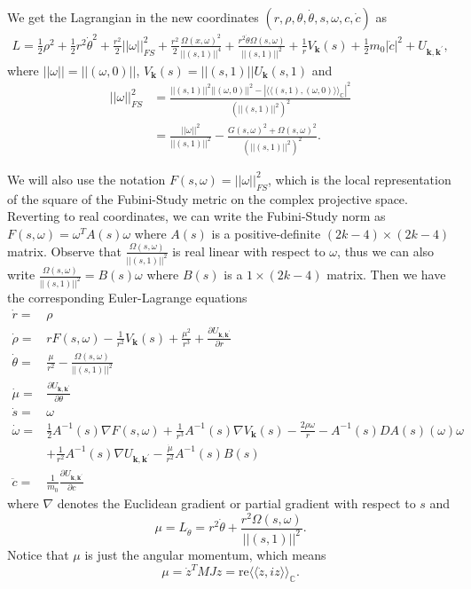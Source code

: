 \documentclass[11pt]{amsart}
\theoremstyle{definition}
\theoremstyle{remark}
\numberwithin{equation}{section}
\newcommand{\tht}{\theta}
\newcommand{\om}{\omega}
\begin{document}
We get the Lagrangian in the new coordinates $(r, \rho, \tht, \dot{\tht}, s, \om, c, \dot{c})$ as
\begin{align*}
    L=\frac{1}{2}\rho^2+\frac{1}{2}r^2\dot{\theta}^2+\frac{r^2}{2}||\omega||_{FS}^2+\frac{r^2}{2}\frac{\Omega(x,\omega)^2}{||(s,1)||^4}+\frac{r^2\dot{\theta}\Omega(s,\omega)}{||(s,1)||^2}+\frac{1}{r}V_\mathbf{k}(s)+\frac{1}{2}m_0|\dot{c}|^2+U_{\mathbf{k},\mathbf{k}^\prime},
\end{align*}
where $||\omega|| = ||(\omega,0)||$, $V_{\mathbf{k}}(s)=||(s,1)||U_{\mathbf{k}}(s,1)$ and 
\begin{align*}
    ||\omega||_{FS}^2&=\frac{||(s,1)||^2||(\omega,0)||^2-|\langle\langle(s,1),(\omega,0)\rangle\rangle_{\mathbb{C}}|^2}{(||(s,1)||^2)^2}\\
    &=\frac{||\omega||^2}{||(s,1)||^2}-\frac{G(s,\omega)^2+\Omega(s,\omega)^2}{(||(s,1)||^2)^2}.
\end{align*}

We will also use the notation $F(s,\omega)=||\omega||_{FS}^2$, which is the local representation of the square of the Fubini-Study metric on the complex projective space.\\
\indent Reverting to real coordinates, we can write the Fubini-Study norm as $F(s,\omega)=\omega^TA(s)\omega$ where $A(s)$ is a positive-definite $(2k-4)\times(2k-4)$ matrix. Observe that $\frac{\Omega(s,\omega)}{||(s,1)||^2}$ is real linear with respect to $\omega$, thus we can also write $\frac{\Omega(s,\omega)}{||(s,1)||^2}=B(s)\omega$ where $B(s)$ is a $1\times(2k-4)$ matrix. Then we have the corresponding Euler-Lagrange equations
\begin{equation}
\label{eq;EL-eq}
\begin{aligned}
    \dot{r}=&\rho\\
    \dot{\rho}=&rF(s,\omega)-\frac{1}{r^2}V_\mathbf{k}(s)+\frac{\mu^2}{r^3}+\frac{\partial U_{\mathbf{k},\mathbf{k}^\prime}}{\partial r}\\
    \dot{\theta}=&\frac{\mu}{r^2}-\frac{\Omega(s,\omega)}{||(s,1)||^2}\\
    \dot{\mu}=&\frac{\partial U_{\mathbf{k},\mathbf{k}^\prime}}{\partial \theta}\\
    \dot{s}=&\omega\\
    \dot{\omega}=&\frac{1}{2}A^{-1}(s)\nabla F(s,\omega)+\frac{1}{r^3}A^{-1}(s)\nabla V_{\mathbf{k}}(s)-\frac{2\rho\omega}{r}-A^{-1}(s)DA(s)(\omega)\omega\\&+\frac{1}{r^2}A^{-1}(s)\nabla U_{\mathbf{k},\mathbf{k}^\prime}-\frac{\dot{\mu}}{r^2}A^{-1}(s)B(s)\\
    \ddot{c}=&\frac{1}{m_0}\frac{\partial U_{\mathbf{k},\mathbf{k}^\prime}}{\partial c}
    \end{aligned}
\end{equation}
where $\nabla$ denotes the Euclidean gradient or partial gradient with respect to $s$ and 
$$ \mu=L_{\dot{\theta}}=r^2\dot{\theta}+\frac{r^2\Omega(s,\omega)}{||(s,1)||^2}. $$
Notice that $\mu$ is just the angular momentum, which means
\begin{equation}
\label{eq;angular-mom}
    \mu=\dot{z}^TMJz=\text{re}\langle\langle\dot{z},iz\rangle\rangle_{\mathbb{C}}.
\end{equation}
\end{document}
